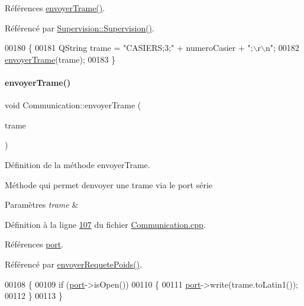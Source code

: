 Références \hyperlink{_communication_8cpp_source_l00107}{envoyer\+Trame()}.



Référencé par \hyperlink{_supervision_8cpp_source_l00036}{Supervision\+::\+Supervision()}.


\begin{DoxyCode}
00180 \{
00181     QString trame = \textcolor{stringliteral}{"CASIERS;3;"} + numeroCasier + \textcolor{stringliteral}{";\(\backslash\)r\(\backslash\)n"};
00182     \hyperlink{class_communication_a53c26abe4c16ff155a15929dd5ad07cf}{envoyerTrame}(trame);
00183 \}
\end{DoxyCode}
\mbox{\label{class_communication_a53c26abe4c16ff155a15929dd5ad07cf}} 
\paragraph{\texorpdfstring{envoyer\+Trame()}{envoyerTrame()}}
{\footnotesize\ttfamily void Communication\+::envoyer\+Trame (\begin{DoxyParamCaption}\item[{Q\+String}]{trame }\end{DoxyParamCaption})}



Définition de la méthode envoyer\+Trame. 

Méthode qui permet d\textquotesingle{}envoyer une trame via le port série 
\begin{DoxyParams}{Paramètres}
{\em trame} & \\
\hline
\end{DoxyParams}


Définition à la ligne \hyperlink{_communication_8cpp_source_l00107}{107} du fichier \hyperlink{_communication_8cpp_source}{Communication.\+cpp}.



Références \hyperlink{_communication_8h_source_l00067}{port}.



Référencé par \hyperlink{_communication_8cpp_source_l00179}{envoyer\+Requete\+Poids()}.


\begin{DoxyCode}
00108 \{
00109     \textcolor{keywordflow}{if} (\hyperlink{class_communication_aff7d55208f31232fbdc1dcec488908f1}{port}->isOpen())
00110     \{
00111        \hyperlink{class_communication_aff7d55208f31232fbdc1dcec488908f1}{port}->write(trame.toLatin1());
00112     \}
00113 \}
\end{DoxyCode}
\mbox{\label{class_communication_ad5969603a6b7232d0227a461fd479251}} 
